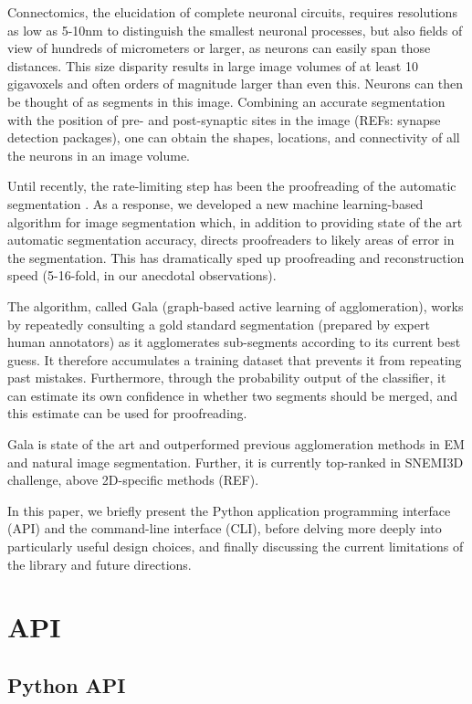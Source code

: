 \documentclass{frontiersSCNS} %
\begin{document}
Connectomics, the elucidation of complete neuronal circuits, requires resolutions as low as 5-10nm to distinguish the smallest neuronal processes, but also fields of view of hundreds of micrometers or larger, as neurons can easily span those distances.
This size disparity results in large image volumes of at least 10 gigavoxels and often orders of magnitude larger than even this.
Neurons can then be thought of as segments in this image.
Combining an accurate segmentation with the position of pre- and post-synaptic sites in the image (REFs: synapse detection packages), one can obtain the shapes, locations, and connectivity of all the neurons in an image volume.

Until recently, the rate-limiting step has been the proofreading of the automatic segmentation  \citep{Chklovskii:2010df}.
As a response, we developed a new machine learning-based algorithm for image segmentation \citep{NunezIglesias:2013cd} which, in addition to providing state of the art automatic segmentation accuracy, directs proofreaders to likely areas of error in the segmentation.
This has dramatically sped up proofreading and reconstruction speed (5-16-fold, in our anecdotal observations).

The algorithm, called Gala (graph-based active learning of agglomeration), works by repeatedly consulting a gold standard segmentation (prepared by expert human annotators) as it agglomerates sub-segments according to its current best guess.
It therefore accumulates a training dataset that prevents it from repeating past mistakes.
Furthermore, through the probability output of the classifier, it can estimate its own confidence in whether two segments should be merged, and this estimate can be used for proofreading.

Gala is state of the art and outperformed previous agglomeration methods in EM and natural image segmentation.
Further, it is currently top-ranked in SNEMI3D challenge, above 2D-specific methods (REF).

In this paper, we briefly present the Python application programming interface (API) and the command-line interface (CLI), before delving more deeply into particularly useful design choices, and finally discussing the current limitations of the library and future directions.


\section{API}


\subsection{Python API}
\end{document}
